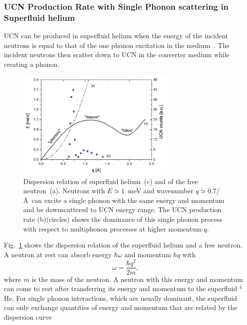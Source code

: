 \subsubsection{UCN Production Rate with Single Phonon scattering in
  Superfluid
  helium\label{sec:UCN_production}}
UCN can be produced in superfluid helium when the energy of the
incident neutrons is equal to that of the one phonon excitation in the
medium~\cite{Korobkina2002,Schmidt2009,Golub77}. The incident neutrons
then scatter down to UCN in the converter medium while creating a
phonon.
\begin{figure}[h!]
\begin{center}
   \includegraphics[width=0.7\textwidth]{FIG1_2.PNG}
    \caption{\cite{PSI_news} Dispersion relation of superfluid
      helium~(c) and of the free neutron~(a). Neutrons with $E\simeq
      1$~meV and wavenumber $q \simeq 0.7$/\AA~can excite a single
      phonon with the same energy and momentum and be downscattered to
      UCN energy range. The UCN production rate (b)(circles) shows the
      dominance of this single phonon process with respect to
      multiphonon processes at higher momentum $q$.
    }
    \label{fig:FIG1}
    \end{center}
\end{figure} 
Fig.~\ref{fig:FIG1} shows the dispersion relation of the superfluid
helium and a free neutron. A neutron at rest can absorb energy $\hbar
\omega$ and momentum $\hbar q$ with
\begin{equation}
\label{neutron_energy}
\omega=\frac{\hbar q^2}{2m},
\end{equation}
where $m$ is the mass of the neutron. A neutron with this energy and momentum can
come to rest after transferring its energy and momentum to the
superfluid $^4$He. For single phonon interactions, which are usually
dominant, the superfluid can only exchange quantities of energy and
momentum that are related by the dispersion curve

